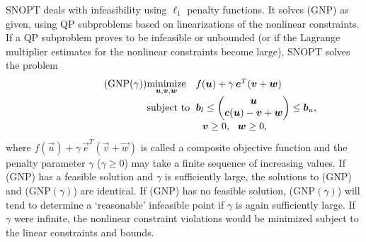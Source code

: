 \documentclass[twocolumn,numbook]{svjour3}          %
\makeatletter
\def\u{{\vec u}}
\def\c{{\vec c}}
\def\w{{\vec w}}
\def\v{{\vec v}}
\def\e{{\vec e}}
\def\b{{\vec b}}
\def\A{{\vec A}}
\def\minim{\mathop{\hbox{\rm minimize}}}
\def\minimize#1{{\displaystyle\minim_{#1}}}
\def\subject{\mbox{\rm subject to}}
\def\strutl{\rule[-1.25ex]{0pt}{3ex}}%
\def\NP#1{NP$(#1)$}
\def\GNP#1{GNP$(#1)$}
\def\SNOPT {{\small SNOPT}}
\def\problem#1#2#3#4{%
   {\begin{tabular*}{0.47\textwidth}
    {@{}l@{\extracolsep{\fill}}l@{\extracolsep{6pt}}l@{\extracolsep{\fill}}c@{}}
      #1 & $\minimize{#2}$ & $#3$ & $ $ \\[5pt]
         & $\subject$      & $#4$ & $ $
    \end{tabular*}}}
\def\newproblem#1#2#3#4#5{%
   {\begin{tabular*}{0.47\textwidth}
    {@{}l@{\extracolsep{\fill}}l@{\extracolsep{6pt}}l@{\extracolsep{\fill}}c@{}}
      #1 & $\minimize{#2}$ & $#3$ & $ $ \\[5pt]
         & $\subject$      & $#4$ & $ $ \\[5pt]
         & & $#5$ & $ $
    \end{tabular*}}}
\newcommand{\pmat}[1]{\begin{pmatrix}#1\end{pmatrix}}
\makeatother
\begin{document}
\SNOPT{} deals with infeasibility using $\ell_1$ penalty functions.
%
%
It solves (GNP) as given, using QP subproblems
based on linearizations of the nonlinear constraints.
If a QP subproblem proves to be infeasible or unbounded (or if the
Lagrange multiplier estimates for the nonlinear constraints become
large), \SNOPT{} solves the problem
\[
   \newproblem{(\GNP{\gamma})}{\u,\v,\w}{f(\u) + \gamma \, \e^T(\v + \w)}
                 { \b_l \le \pmat{\u\\ \c(\u) - \v + \w \strutl} \le \b_u,}
                 { \ \ \v \ge 0, \ \ \w \ge 0,}
\]
where $f(\u) + \gamma \, \e^T(\v + \w)$ is called a composite objective function
and the penalty parameter $\gamma$ ($\gamma \ge 0$) may take a
finite sequence of increasing values.  
If (GNP) has a feasible solution and $\gamma$ is sufficiently large,
the solutions to (GNP) and (\GNP{\gamma}) are identical.
If (GNP) has no feasible solution, (\GNP{\gamma}) will tend to
determine a `reasonable' infeasible point if $\gamma$ is again sufficiently
large.  If $\gamma$ were infinite, the nonlinear constraint violations would
be minimized subject to the linear constraints and bounds.
\end{document}

